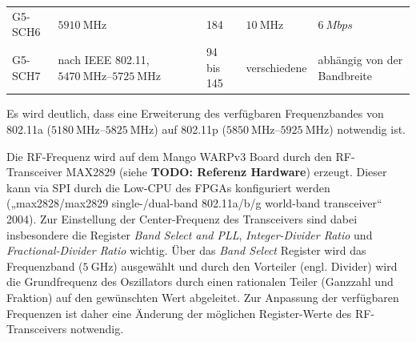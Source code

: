 \documentclass[ngerman,]{scrartcl}
\begin{document}
\begin{longtable}[]{@{}lllll@{}}
\begin{minipage}[t]{0.08\columnwidth}
G5-SCH6\strut
\end{minipage} & \begin{minipage}[t]{0.30\columnwidth}\raggedright\strut
\(\SI{5910}{\mega\hertz}\)\strut
\end{minipage} & \begin{minipage}[t]{0.16\columnwidth}\raggedright\strut
184\strut
\end{minipage} & \begin{minipage}[t]{0.14\columnwidth}\raggedright\strut
\(\SI{10}{\mega\hertz}\)\strut
\end{minipage} & \begin{minipage}[t]{0.18\columnwidth}\raggedright\strut
\(\SI{6}{Mbps}\)\strut
\end{minipage}\tabularnewline
\begin{minipage}[t]{0.08\columnwidth}\raggedright\strut
G5-SCH7\strut
\end{minipage} & \begin{minipage}[t]{0.30\columnwidth}\raggedright\strut
nach IEEE 802.11, \(\SIrange{5470}{5725}{\mega\hertz}\)\strut
\end{minipage} & \begin{minipage}[t]{0.16\columnwidth}\raggedright\strut
94 bis 145\strut
\end{minipage} & \begin{minipage}[t]{0.14\columnwidth}\raggedright\strut
verschiedene\strut
\end{minipage} & \begin{minipage}[t]{0.18\columnwidth}\raggedright\strut
abhängig von der Bandbreite\strut
\end{minipage}\tabularnewline
\bottomrule
\end{longtable}

Es wird deutlich, dass eine Erweiterung des verfügbaren Frequenzbandes
von 802.11a (\(\SIrange{5180}{5825}{\mega\hertz}\)) auf 802.11p
(\(\SIrange{5850}{5925}{\mega\hertz}\)) notwendig ist.

Die RF-Frequenz wird auf dem Mango WARPv3 Board durch den RF-Transceiver
MAX2829 (siehe \textbf{TODO: Referenz Hardware}) erzeugt. Dieser kann
via SPI durch die Low-CPU des FPGAs konfiguriert werden
(„max2828/max2829 single-/dual-band 802.11a/b/g world-band transceiver``
2004). Zur Einstellung der Center-Frequenz des Transceivers sind dabei
insbesondere die Register \emph{Band Select and PLL},
\emph{Integer-Divider Ratio} und \emph{Fractional-Divider Ratio}
wichtig. Über das \emph{Band Select} Register wird das Frequenzband
(\(\SI{5}{\giga\hertz}\)) ausgewählt und durch den Vorteiler (engl.
Divider) wird die Grundfrequenz des Oszillators durch einen rationalen
Teiler (Ganzzahl und Fraktion) auf den gewünschten Wert abgeleitet. Zur
Anpassung der verfügbaren Frequenzen ist daher eine Änderung der
möglichen Register-Werte des RF-Transceivers notwendig.
\end{document}
